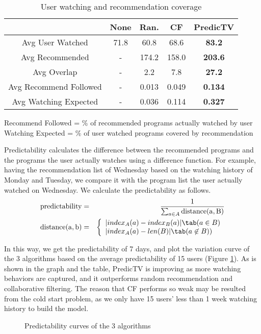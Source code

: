 \begin{table}[!hbp]
\begin{center}
\begin{tabular}{|c|c|c|c|c|}
\hline
                       & None &  Ran.  & CF  & PredicTV\\
\hline
\hline
Avg User Watched       & 71.8 &  60.8  & 68.6& \bf{83.2}\\
\hline
Avg Recommended        &  -   &  174.2 &158.0& \bf{203.6} \\
\hline
Avg Overlap            &  -   &  2.2   & 7.8 & \bf{27.2}  \\
\hline
Avg Recommend Followed &  -   &  0.013 &0.049& \bf{0.134} \\
\hline
Avg Watching Expected  &  -   &  0.036 &0.114& \bf{0.327} \\
\hline
\end{tabular}
\end{center}
Recommend Followed = \% of recommended programs actually watched by user\\
Watching Expected = \% of user watched programs covered by recommendation
\caption{\label{tab:coverage}User watching and recommendation coverage}
\end{table}

Predictability calculates the difference between the recommended programs and
the programs the user actually watches using a difference function. 
For example, having the recommendation 
list of Wednesday based on the watching history of Monday and Tuesday, we 
compare it with the program list the user actually watched on Wednesday.
We calculate the predictability as follows.
\begin{eqnarray*}
\rm{predictability} &=& \frac{1}{\sum_{a \in A} \rm{distance}(a,B)}\\
\rm{distance}(a, b) &=& \left\{
		\begin{array}{ll}
			| index_A(a)  - index_B(a)|    \tab(a \in B) \\
			| index_A(a) - len(B) |   \tab	(a \not\in B))
		\end{array}\right.
\end{eqnarray*}

In this way, we get the predictability of 7 days, and plot the variation
curve of the 3 algorithms based on the average predictability of 15 users
 (Figure \ref{fig:predict}). As is shown in the graph and the table, PredicTV is improving as more watching behaviors are captured, and it outperforms random
recommendation and collaborative filtering. The reason that CF performs 
so weak may be resulted from the cold start
\cite{Schein02:ColdStart}problem, as we only have 15 users' less than 1 week 
watching history to build the model.

\begin{figure}[h]
\begin{center}
\caption{\label{fig:predict}Predictability curves of the 3 algorithms}
\end{center}
\end{figure}
